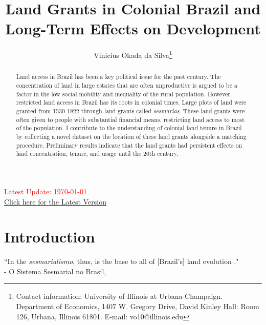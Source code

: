 \documentclass{article}
\title{Land Grants in Colonial Brazil and Long-Term Effects on Development}
\author{Vinicius Okada da Silva\thanks{Contact information: University of Illinois at Urbana-Champaign. Department of Economics, 1407 W. Gregory Drive, David Kinley Hall: Room 126, Urbana, Illinois 61801. E-mail: vo10@illinois.edu}}
\affil{Department of Economics, University of Illinois at Urbana-Champaign}
\date{}
\begin{document}
\maketitle
\thispagestyle{empty} 

\vspace{-.1cm}
\begin{center}
  \textcolor{red}{Latest Update: \today}
  \\
  \href{https://viniokadasilva.github.io/Papers/Sesmarias/02.Draft/02.Second_Draft/Sesmarias_Paper.pdf}{Click here for the Latest Version}
\end{center}
\vspace{.1cm}

\begin{abstract}
  Land access in Brazil has been a key political issue for the past century. The concentration of land in large estates that are often unproductive is argued to be a factor in the low social mobility and inequality of the rural population. However, restricted land access in Brazil has its roots in colonial times. Large plots of land were granted from 1530-1822 through land grants called \textit{sesmarias}. These land grants were often given to people with substantial financial means, restricting land access to most of the population. I contribute to the understanding of colonial land tenure in Brazil by collecting a novel dataset on the location of these land grants alongside a matching procedure. Preliminary results indicate that the land grants had persistent effects on land concentration, tenure, and usage until the 20th century.
\end{abstract}

\clearpage
{} 

\section{Introduction}

\begin{displayquote}
  ``In the \textit{sesmarialismo}, thus, is the base to all of [Brazil's] land evolution ."
  \\ 
  \smallskip
  - O Sistema Sesmarial no Brasil, \textcite[p.~25]{Da_Costa_Porto1979-dz}
  \end{displayquote}
\end{document}

